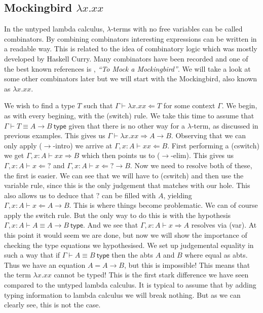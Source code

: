 \subsection{Mockingbird \texorpdfstring{$\lambda x . x x$}{}} %

In the untyped lambda calculus, $\lambda$-terms with no free variables can be called combinators. By combining combinators interesting expressions can be written in a readable way. This is related to the idea of combinatory logic which was mostly developed by Haskell Curry. Many combinators have been recorded and one of the best known references is \cite{smullyan2012mock}, \emph{``To Mock a Mockingbird''}. We will take a look at some other combinators later but we will start with the Mockingbird, also known as $\lambda x . x x$.

\begin{example}\label{mockingbird}
    We wish to find a type $T$ such that $\Gamma \vdash \lambda x . x x \Leftarrow T$ for some context $\Gamma$. We begin, as with every begining, with the (switch) rule. We take this time to assume that $\Gamma \vdash T \equiv A \to B \ \mathsf{type}$ given that there is no other way for a $\lambda$-term, as discussed in previous examples. This gives us $\Gamma \vdash \lambda x . x x \Rightarrow A \to B$. Observing that we can only apply ($\to$-intro) we arrive at $\Gamma , x : A\vdash x x \Leftarrow B$. First performing a (cswitch) we get $\Gamma , x : A\vdash x x \Rightarrow B$ which then points us to ($\to$-elim). This gives us $\Gamma , x : A \vdash x \Leftarrow \boxed{?}$ and $\Gamma , x : A \vdash x \Leftarrow \boxed{?} \to B$. Now we need to resolve both of these, the first is easier. We can see that we will have to (cswitch) and then use the variable rule, since this is the only judgement that matches with our hole. This also allows us to deduce that $\boxed{?}$ can be filled with $A$, yielding $\Gamma , x : A \vdash x \Leftarrow A \to B$. This is where things become problematic. We can of course apply the switch rule. But the only way to do this is with the hypothesis $\Gamma , x : A \vdash A \equiv A \to B \ \mathsf{type}$. And we see that $\Gamma , x : A \vdash x \Rightarrow A$ resolves via (var).
    At this point it would seem we are done, but now we will show the importance of checking the type equations we hypothesised. We set up judgemental equality in such a way that if $\Gamma \vdash A \equiv B \ \mathsf{type}$ then the abts $A$ and $B$ where equal as abts. Thus we have an equation $A = A \to B$, but this is impossible!
    This means that the term $\lambda x . x x$ cannot be typed! This is the first stark difference we have seen compared to the untyped lambda calculus. It is typical to assume that by adding typing information to lambda calculus we will break nothing. But as we can clearly see, this is not the case. 
\end{example}

